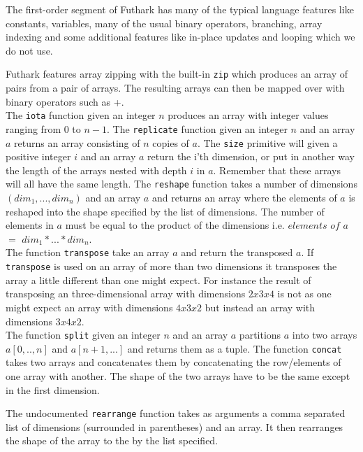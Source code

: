 \documentclass[11pt]{article}
\begin{document}
The first-order segment of Futhark has many of the typical language features like constants, variables, many of the usual binary operators, branching, array indexing and some additional features like in-place updates and looping which we do not use.

Futhark features array zipping with the built-in {\tt zip} which produces an array of pairs from a pair of arrays.
The resulting arrays can then be mapped over with binary operators such as +.\\

The {\tt iota} function given an integer $n$ produces an array with integer values ranging from 0 to $n-1$.
The {\tt replicate} function given an integer $n$ and an array $a$ returns an array consisting of $n$ copies of $a$.
The {\tt size} primitive will given a positive integer $i$ and an array $a$ return the i'th dimension, or put in another way
the length of the arrays nested with depth $i$ in $a$. Remember that these arrays will all have the same length.
The {\tt reshape} function takes a number of dimensions $(dim_1,..., dim_n)$ and an array $a$ and returns an array where the elements of $a$ is reshaped into the shape specified by the list of dimensions.
The number of elements in $a$ must be equal to the product of the dimensions i.e. $elements$ $of$ $a$ $=$ $dim_1 * ... * dim_n$.\\

The function {\tt transpose} take an array $a$ and return the transposed $a$.
If {\tt transpose} is used on an array of more than two dimensions it transposes the array a little different than one might expect.
For instance the result of transposing an three-dimensional array with dimensions $2 x 3 x 4$ is not as one might expect an array with dimensions $4 x 3x 2$ but instead an array with dimensions $3x4x2$.\\

The function {\tt split} given an integer $n$ and an array $a$ partitions $a$ into two arrays $a[0,..,n]$ and $a[n+1,...]$ and returns them as a tuple. 
The function {\tt concat} takes two arrays and concatenates them by concatenating the row/elements of one array with another. The shape of the two arrays have to be the same except in the first dimension. 

The undocumented {\tt rearrange} function takes as arguments a comma separated list of dimensions (surrounded in parentheses) and an array. It then rearranges the shape of the array to the by the list specified. \\
\end{document}
